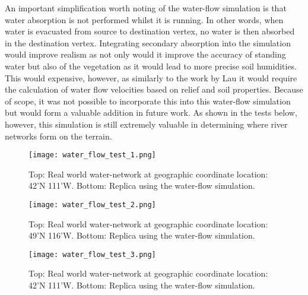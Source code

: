 An important simplification worth noting of the water-flow simulation is that water absorption is not performed whilst it is running. In other words, when water is evacuated from source to destination vertex, no water is then absorbed in the destination vertex. Integrating secondary absorption into the simulation would improve realism as not only would it improve the accuracy of standing water but also of the vegetation as it would lead to more precise soil humidities. This would expensive, however, as similarly to the work by Lau \cite{Lau2010} it would require the calculation of water flow velocities based on relief and soil properties. Because of scope, it was not possible to incorporate this into this water-flow simulation but would form a valuable addition in future work. As shown in the tests below, however, this simulation is still extremely valuable in determining where river networks form on the terrain.

\begin{figure}
\center
	\texttt{[image: water\_flow\_test\_1.png]}
	\caption{ Top: Real world water-network at geographic coordinate location: 42'N 111'W. Bottom: Replica using the water-flow simulation.}
	\label{fig:water_flow_test_1}
\end{figure}

\begin{figure}
\center
	\texttt{[image: water\_flow\_test\_2.png]}
	\caption{ Top: Real world water-network at geographic coordinate location: 49'N 116'W. Bottom: Replica using the water-flow simulation.}
	\label{fig:water_flow_test_2}
\end{figure}

\begin{figure}
\center
	\texttt{[image: water\_flow\_test\_3.png]}
	\caption{ Top: Real world water-network at geographic coordinate location: 42'N 111'W. Bottom: Replica using the water-flow simulation.}
	\label{fig:water_flow_test_3}
\end{figure}